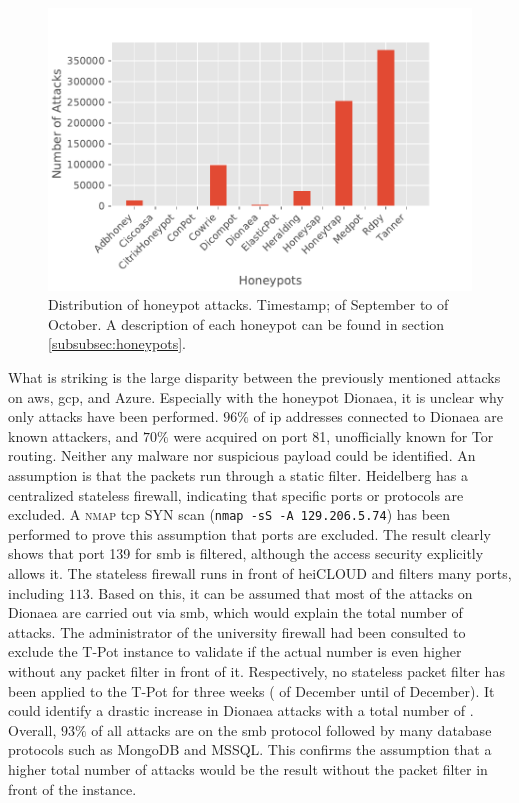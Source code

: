 \begin{figure}[htbp]
    \centering
    \includegraphics[width=\textwidth]{figures/tpot-overview-attacks.pdf}
    \caption[Distribution of honeypot attacks]{
        Distribution of honeypot attacks.
        Timestamp;  of September to  of October.
        A description of each honeypot can be found in section \ref{subsubsec:honeypots}.
    }
    \label{fig:overview-attacks}
\end{figure}

What is striking is the large disparity between the previously mentioned attacks on \ac{aws}, \ac{gcp}, and Azure.
Especially with the honeypot Dionaea, it is unclear why only  attacks have been performed.
$96\%$ of \ac{ip} addresses connected to Dionaea are known attackers, and $70\%$ were acquired on port 81, unofficially known for Tor routing.
Neither any malware nor suspicious payload could be identified.
An assumption is that the packets run through a static filter.
Heidelberg has a centralized stateless firewall, indicating that specific ports or protocols are excluded.
A \textsc{nmap} \ac{tcp} SYN scan (\verb|nmap -sS -A 129.206.5.74|) has been performed to prove this assumption that ports are excluded.
The result clearly shows that port 139 for \ac{smb} is filtered, although the access security explicitly allows it.
The stateless firewall runs in front of heiCLOUD and filters many ports, including $113$.
Based on this, it can be assumed that most of the attacks on Dionaea are carried out via \ac{smb}, which would explain the total number of attacks.
The administrator of the university firewall had been consulted to exclude the T-Pot instance to validate if the actual number is even higher without any packet filter in front of it.
Respectively, no stateless packet filter has been applied to the T-Pot for three weeks ( of December until  of December).
It could identify a drastic increase in Dionaea attacks with a total number of .
Overall, $93\%$ of all attacks are on the \ac{smb} protocol followed by many database protocols such as MongoDB and MSSQL.
This confirms the assumption that a higher total number of attacks would be the result without the packet filter in front of the instance.

